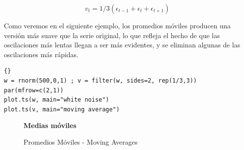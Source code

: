 \begin{equation*}
v_t = 1/3 (\epsilon_{t-1} + \epsilon_t + \epsilon_{t+1})
\end{equation*}

Como veremos en el siguiente ejemplo, los promedios m\'oviles producen una versi\'on m\'as suave que la serie original, lo que refleja el hecho de que las oscilaciones m\'as lentas llegan a ser m\'as evidentes, y se eliminan algunas de las oscilaciones m\'as r\'apidas. 


\begin{lstlisting}[title={‘Código R para generar Moving Averages’},basicstyle=\ttfamily]{}
w = rnorm(500,0,1) ; v = filter(w, sides=2, rep(1/3,3))
par(mfrow=c(2,1))
plot.ts(w, main="white noise")
plot.ts(v, main="moving average")
\end{lstlisting}\label{movingAverage}
\begin{figure}[H]
	\centering
	\textbf{Medias móviles}\par\medskip
	\caption{Promedios Móviles - Moving Averages}\label{figura8}
\end{figure}

